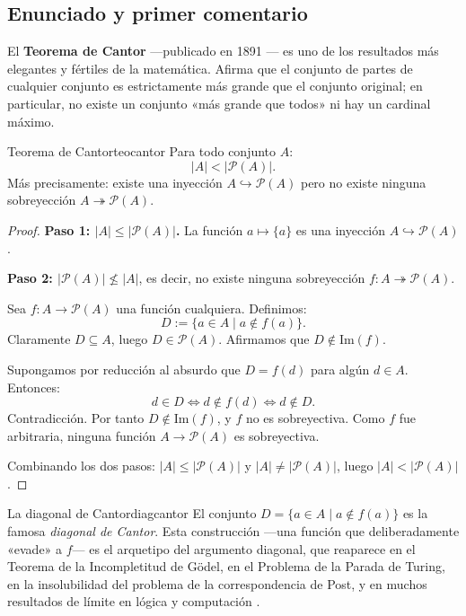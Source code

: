 \subsection{Enunciado y primer comentario}

El \textbf{Teorema de Cantor} —publicado en 1891 \cite{cantor1891}— es uno de los resultados más elegantes y fértiles de la matemática. Afirma que el conjunto de partes de cualquier conjunto es estrictamente más grande que el conjunto original; en particular, no existe un conjunto «más grande que todos» ni hay un cardinal máximo.

\begin{teorema}{Teorema de Cantor}{teocantor}
Para todo conjunto $A$:
\[
  |A| < |\mathcal{P}(A)|.
\]
Más precisamente: existe una inyección $A \hookrightarrow \mathcal{P}(A)$ pero no existe ninguna sobreyección $A \twoheadrightarrow \mathcal{P}(A)$.
\end{teorema}

\begin{proof}
\textbf{Paso 1: $|A| \leq |\mathcal{P}(A)|$.} La función $a \mapsto \{a\}$ es una inyección $A \hookrightarrow \mathcal{P}(A)$.

\textbf{Paso 2: $|\mathcal{P}(A)| \not\leq |A|$}, es decir, no existe ninguna sobreyección $f \colon A \twoheadrightarrow \mathcal{P}(A)$.

Sea $f \colon A \to \mathcal{P}(A)$ una función cualquiera. Definimos:
\[
  D := \bigl\{a \in A \mid a \notin f(a)\bigr\}.
\]
Claramente $D \subseteq A$, luego $D \in \mathcal{P}(A)$. Afirmamos que $D \notin \mathrm{Im}(f)$.

Supongamos por reducción al absurdo que $D = f(d)$ para algún $d \in A$. Entonces:
\[
  d \in D \iff d \notin f(d) \iff d \notin D.
\]
Contradicción. Por tanto $D \notin \mathrm{Im}(f)$, y $f$ no es sobreyectiva. Como $f$ fue arbitraria, ninguna función $A \to \mathcal{P}(A)$ es sobreyectiva.

Combinando los dos pasos: $|A| \leq |\mathcal{P}(A)|$ y $|A| \neq |\mathcal{P}(A)|$, luego $|A| < |\mathcal{P}(A)|$.
\end{proof}

\begin{observacion}{La diagonal de Cantor}{diagcantor}
El conjunto $D = \{a \in A \mid a \notin f(a)\}$ es la famosa \emph{diagonal de Cantor}. Esta construcción —una función que deliberadamente «evade» a $f$— es el arquetipo del argumento diagonal, que reaparece en el Teorema de la Incompletitud de Gödel, en el Problema de la Parada de Turing, en la insolubilidad del problema de la correspondencia de Post, y en muchos resultados de límite en lógica y computación \cite{enderton2001, mendelson2015}.
\end{observacion}


